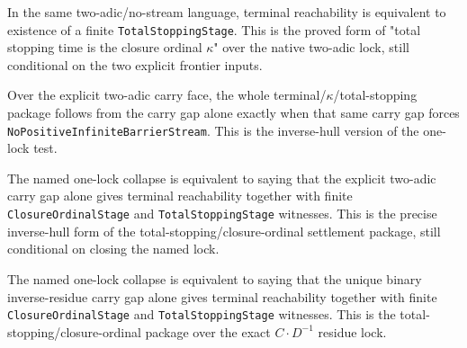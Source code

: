 \begin{theorem}
  \label{thm:collatz-two-adic-total-stopping-stage}
  \leanok
  In the same two-adic/no-stream language, terminal reachability is equivalent to
  existence of a finite \texttt{TotalStoppingStage}. This is the proved form of
  "total stopping time is the closure ordinal \(\kappa\)" over the native
  two-adic lock, still conditional on the two explicit frontier inputs.
\end{theorem}
\begin{theorem}
  \label{thm:collatz-two-adic-kappa-package-criterion}
  \leanok
  Over the explicit two-adic carry face, the whole terminal/\(\kappa\)/total-stopping
  package follows from the carry gap alone exactly when that same carry gap forces
  \texttt{NoPositiveInfiniteBarrierStream}. This is the inverse-hull version of the
  one-lock test.
\end{theorem}
\begin{theorem}
  \label{thm:collatz-two-adic-named-kappa-package}
  \leanok
  The named one-lock collapse is equivalent to saying that the explicit two-adic
  carry gap alone gives terminal reachability together with finite
  \texttt{ClosureOrdinalStage} and \texttt{TotalStoppingStage} witnesses. This is
  the precise inverse-hull form of the total-stopping/closure-ordinal settlement
  package, still conditional on closing the named lock.
\end{theorem}
\begin{theorem}
  \label{thm:collatz-two-adic-unique-named-kappa-package}
  \leanok
  The named one-lock collapse is equivalent to saying that the unique binary
  inverse-residue carry gap alone gives terminal reachability together with finite
  \texttt{ClosureOrdinalStage} and \texttt{TotalStoppingStage} witnesses. This is
  the total-stopping/closure-ordinal package over the exact \(C\cdot D^{-1}\)
  residue lock.
\end{theorem}
